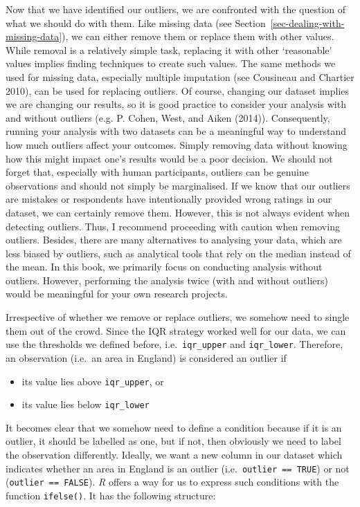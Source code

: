 \documentclass[
  letterpaper,
]{krantz}
\begin{document}
Now that we have identified our outliers, we are confronted with the
question of what we should do with them. Like missing data (see
Section~\ref{sec-dealing-with-missing-data}), we can either remove them
or replace them with other values. While removal is a relatively simple
task, replacing it with other `reasonable' values implies finding
techniques to create such values. The same methods we used for missing
data, especially multiple imputation (see Cousineau and Chartier 2010),
can be used for replacing outliers. Of course, changing our dataset
implies we are changing our results, so it is good practice to consider
your analysis with and without outliers (e.g. P. Cohen, West, and Aiken
(2014)). Consequently, running your analysis with two datasets can be a
meaningful way to understand how much outliers affect your outcomes.
Simply removing data without knowing how this might impact one's results
would be a poor decision. We should not forget that, especially with
human participants, outliers can be genuine observations and should not
simply be marginalised. If we know that our outliers are mistakes or
respondents have intentionally provided wrong ratings in our dataset, we
can certainly remove them. However, this is not always evident when
detecting outliers. Thus, I recommend proceeding with caution when
removing outliers. Besides, there are many alternatives to analysing
your data, which are less biased by outliers, such as analytical tools
that rely on the median instead of the mean. In this book, we primarily
focus on conducting analysis without outliers. However, performing the
analysis twice (with and without outliers) would be meaningful for your
own research projects.

Irrespective of whether we remove or replace outliers, we somehow need
to single them out of the crowd. Since the IQR strategy worked well for
our data, we can use the thresholds we defined before,
i.e.~\texttt{iqr\_upper} and \texttt{iqr\_lower}. Therefore, an
observation (i.e.~an area in England) is considered an outlier if

\begin{itemize}
\item
  its value lies above \texttt{iqr\_upper}, or
\item
  its value lies below \texttt{iqr\_lower}
\end{itemize}

It becomes clear that we somehow need to define a condition because if
it is an outlier, it should be labelled as one, but if not, then
obviously we need to label the observation differently. Ideally, we want
a new column in our dataset which indicates whether an area in England
is an outlier (i.e.~\texttt{outlier\ ==\ TRUE}) or not
(\texttt{outlier\ ==\ FALSE}). \emph{R} offers a way for us to express
such conditions with the function \texttt{ifelse()}. It has the
following structure:
\end{document}
